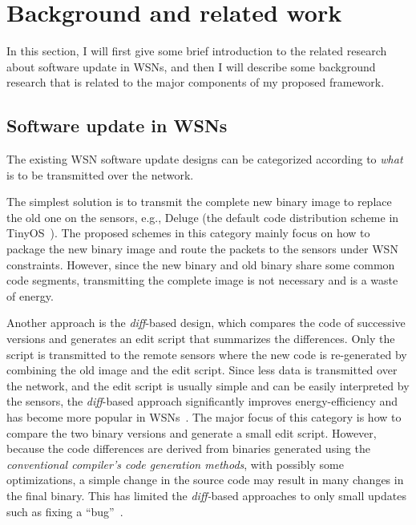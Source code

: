 \chapter{Background and related work}\label{chap:related}

In this section, I will first give some brief introduction to the related research about software update in WSNs, and then I will describe some background research that is related to the major components of my proposed framework.


\section{Software update in WSNs}

The existing WSN software update designs can be categorized according to {\em what} is to be transmitted over the network. 

The simplest solution is to transmit the complete new binary image to replace the old one on the sensors, e.g., Deluge (the default code distribution scheme in TinyOS~\cite{tinyos}).
The proposed schemes in this category mainly focus on how to package the new binary image and route the packets to the sensors under WSN constraints.
However, since the new binary and old binary share some common code segments, transmitting the complete image is not necessary and is a waste of energy.

Another approach is the {\em diff}-based design, which compares the code of successive versions and generates an edit script that summarizes the differences.
Only the script is transmitted to the remote sensors where the new code is re-generated by combining the old image and the edit script.  Since
less data is transmitted over the network, and the edit script is usually simple and can be easily interpreted by the sensors, the {\em diff}-based approach significantly improves energy-efficiency and has
become more popular in WSNs~\cite{related:script,stream,related:jeong-script,related:dynamic1,related:dynamic2,related:flexcup}.
The major focus of this category is how to compare the two binary versions and generate a small edit script.
However, because the code differences are derived from binaries generated using the {\em conventional compiler's code generation methods}, with possibly some optimizations, a simple change in the source code may result in many changes in the final binary. This has limited the {\em diff-}based approaches to only small updates such as fixing a ``bug''~\cite{related:script}.


